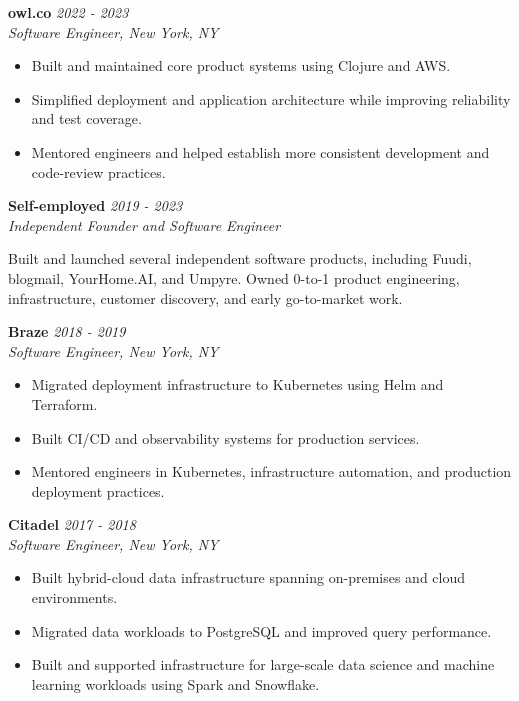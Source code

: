 \documentclass[margin,line]{resume}
\newcommand{\company}[1]{\textbf{#1}}
\newcommand{\jobdates}[1]{\textit{#1}}
\newcommand{\jobtitle}[1]{\textit{#1}}
\begin{document}
\begin{resume}
\filbreak
\company{owl.co} \hfill \jobdates{2022 - 2023}\\
\jobtitle{Software Engineer, New York, NY}

\begin{itemize}
    \item Built and maintained core product systems using Clojure and AWS.
    \item Simplified deployment and application architecture while improving reliability and test coverage.
    \item Mentored engineers and helped establish more consistent development and code-review practices.
\end{itemize}

\filbreak
\company{Self-employed} \hfill \jobdates{2019 - 2023}\\
\jobtitle{Independent Founder and Software Engineer}

Built and launched several independent software products, including Fuudi, blogmail, YourHome.AI, and Umpyre. Owned 0-to-1 product engineering, infrastructure, customer discovery, and early go-to-market work.

\newpage
\vspace*{7pt}

\company{Braze} \hfill \jobdates{2018 - 2019}\\
\jobtitle{Software Engineer, New York, NY}

\begin{itemize}
    \item Migrated deployment infrastructure to Kubernetes using Helm and Terraform.
    \item Built CI/CD and observability systems for production services.
    \item Mentored engineers in Kubernetes, infrastructure automation, and production deployment practices.
\end{itemize}

\filbreak
\company{Citadel} \hfill \jobdates{2017 - 2018}\\
\jobtitle{Software Engineer, New York, NY}

\begin{itemize}
    \item Built hybrid-cloud data infrastructure spanning on-premises and cloud environments.
    \item Migrated data workloads to PostgreSQL and improved query performance.
    \item Built and supported infrastructure for large-scale data science and machine learning workloads using Spark and Snowflake.
\end{itemize}


\end{resume}
\end{document}
